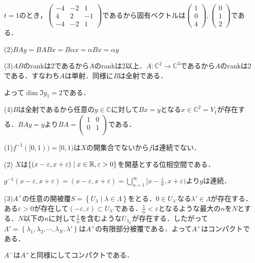 \documentclass[
		book,
		head_space=20mm,
		foot_space=20mm,
		gutter=10mm,
		line_length=190mm
]{jlreq}
\begin{document}
$t=1$のとき，$\begin{pmatrix}
    -4 & -2 & 1\\
    4 & 2 & -1\\
    -4 & -2 & 1
    \end{pmatrix}$であるから固有ベクトルは$\begin{pmatrix}
        1\\
        0\\
        4
    \end{pmatrix},\begin{pmatrix}
        0\\
        1\\
        2
    \end{pmatrix}$である．

(2)$BAy=BABx=B\alpha x=\alpha Bx= \alpha y$

(3)$AB$のrankは2であるから$A$のrankは2以上．$A \colon \mathbb{C}^2 \rightarrow \mathbb{C}^3$であるから$A$のrankは2である．すなわち$A$は単射．同様に$B$は全射である．

よって$\dim \Im g_1=2$である．

(4)$B$は全射であるから任意の$y \in \mathbb{C}$に対して$Bx=y$となる$x \in \mathbb{C}^2=V_1$が存在する．$BAy=y$より$BA=\begin{pmatrix}
    1 & 0\\
    0 & 1\\
\end{pmatrix}$である．

(1)$f^{-1}([0,1))=[0,1)$は$X$の開集合でないから$f$は連続でない．


(2)
$X$は$\left\{ (x-\varepsilon,x+\varepsilon)\mathrel{}\middle|\mathrel{} x \in \mathbb{R}, \varepsilon>0 \right\}$を開基とする位相空間である．

$g^{-1}(x-\varepsilon,x+\varepsilon)=(x-\varepsilon,x+\varepsilon)=\bigcup\limits_{n=1}^\infty [x-\frac{\varepsilon}{n},x+\varepsilon)$より$g$は連続．

(3)$A^+$の任意の開被覆$S=\left\{ U_\lambda \mid \lambda\in \Lambda \right\}$をとる．$0 \in U_{\lambda'}$なる$\lambda' \in \Lambda$が存在する．ある$\varepsilon>0$が存在して$(-\varepsilon,\varepsilon)\subset U_{\lambda'}$である．$\frac{1}{n}<\varepsilon$となるような最大の$n$を$N$とする．$N$以下の$n$に対して$\frac{1}{n}$を含むような$U_{\lambda_n}$が存在する．したがって$\Lambda'= \left\{ \lambda_1,\lambda_2,\cdots,\lambda_N,\lambda' \right\}$は$A^+$の有限部分被覆である．よって$A^+$はコンパクトである．

$A^-$は$A^+$と同様にしてコンパクトである．
\end{document}
